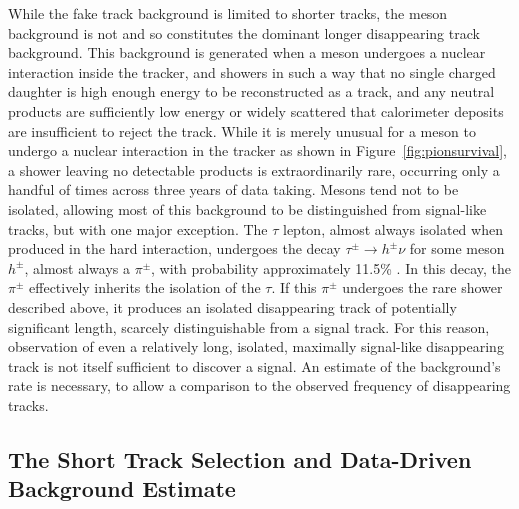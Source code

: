   While the fake track background is limited to shorter tracks, the meson background is not and so constitutes the dominant longer disappearing track background.
  This background is generated when a meson undergoes a nuclear interaction inside the tracker, and showers in such a way that no single charged daughter is high enough energy to be reconstructed as a track, and any neutral products are sufficiently low energy or widely scattered that calorimeter deposits are insufficient to reject the track.
  While it is merely unusual for a meson to undergo a nuclear interaction in the tracker as shown in Figure~\ref{fig:pionsurvival}, a shower leaving no detectable products is extraordinarily rare, occurring only a handful of times across three years of data taking.
  Mesons tend not to be isolated, allowing most of this background to be distinguished from signal-like tracks, but with one major exception.
  The $\tau$ lepton, almost always isolated when produced in the hard interaction, undergoes the decay $\tau^{\pm} \rightarrow h^{\pm}\nu$ for some meson $h^{\pm}$, almost always a $\pi^{\pm}$, with probability approximately 11.5\% \cite{pdg}.
  In this decay, the $\pi^{\pm}$ effectively inherits the isolation of the $\tau$.
  If this $\pi^{\pm}$ undergoes the rare shower described above, it produces an isolated disappearing track of potentially significant length, scarcely distinguishable from a signal track.
  For this reason, observation of even a relatively long, isolated, maximally signal-like disappearing track is not itself sufficient to discover a signal. 
  An estimate of the background's rate is necessary, to allow a comparison to the observed frequency of disappearing tracks.

  \subsection{The Short Track Selection and Data-Driven Background Estimate} \label{sec:distracksbgest}

